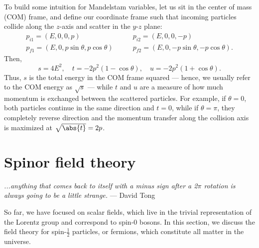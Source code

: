 To build some intuition for Mandelstam variables, let us sit in the center of mass (COM) frame, and define our coordinate frame such that incoming particles collide along the $z$-axis and scatter in the $y$-$z$ plane:
\begin{equation}
	\label{eq:01_qft_interactions_mandelstam_pcom}
	\begin{split}
		p_{i1} = (E, 0, 0, p) &\qquad p_{i2} = (E, 0, 0, -p) \\
		p_{f1} = (E, 0, p\sin\theta, p\cos\theta) &\qquad p_{f2} = (E, 0, -p\sin\theta, -p\cos\theta).
	\end{split}
\end{equation}
Then,
\begin{equation}
	\label{eq:01_qft_interactions_mandelstam_com}
	s = 4E^2, \quad t = -2p^2(1-\cos\theta), \quad u = -2p^2(1+\cos\theta).
\end{equation}
Thus, $s$ is the total energy in the COM frame squared --- hence, we usually refer to the COM energy as $\sqrt{s}$ --- while $t$ and $u$ are a measure of how much momentum is exchanged between the scattered particles.
For example, if $\theta = 0$, both particles continue in the same direction and $t = 0$, while if $\theta = \pi$, they completely 
reverse direction and the momentum transfer along the collision axis is maximized at $\sqrt{\abs{t}} = 2p$.



\section{Spinor field theory}
\label{sec:01_qft_spinors}

\begin{center}
	\centering
	\noindent
	\textit{...anything that comes back to itself with a minus sign after a 2$\pi$ rotation is always going to be a little strange.} --- David Tong~\cite{TongSM}
\end{center}

So far, we have focused on scalar fields, which live in the trivial representation of the Lorentz group and correspond to spin-$0$ bosons.
In this section, we discuss the field theory for spin-$\frac{1}{2}$ particles, or fermions, which constitute all matter in the universe.

